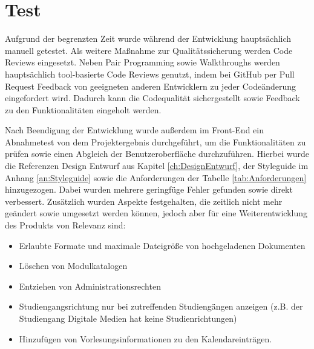 \section{Test}
Aufgrund der begrenzten Zeit wurde während der Entwicklung hauptsächlich manuell getestet. 
Als weitere Maßnahme zur Qualitätssicherung werden Code Reviews eingesetzt.
Neben Pair Programming sowie Walkthroughs werden hauptsächlich tool-basierte Code Reviews genutzt, indem bei GitHub per Pull Request Feedback von geeigneten anderen Entwicklern zu jeder Codeänderung eingefordert wird.
Dadurch kann die Codequalität sichergestellt sowie Feedback zu den Funktionalitäten eingeholt werden.

Nach Beendigung der Entwicklung wurde außerdem im Front-End ein Abnahmetest von dem Projektergebnis durchgeführt, um die Funktionalitäten zu prüfen sowie einen Abgleich der Benutzeroberfläche durchzuführen. 
Hierbei wurde die Referenzen Design Entwurf aus Kapitel \vref{ch:DesignEntwurf}, der Styleguide im Anhang \vref{an:Styleguide} sowie die Anforderungen der Tabelle \vref{tab:Anforderungen} hinzugezogen.
Dabei wurden mehrere geringfüge Fehler gefunden sowie direkt verbessert. 
Zusätzlich wurden Aspekte festgehalten, die zeitlich nicht mehr geändert sowie umgesetzt werden können, jedoch aber für eine Weiterentwicklung des Produkts von Relevanz sind: 

\begin{itemize}
    \item Erlaubte Formate und maximale Dateigröße von hochgeladenen Dokumenten
    \item Löschen von Modulkatalogen 
    \item Entziehen von Administrationsrechten
    \item Studiengangsrichtung nur bei zutreffenden Studiengängen anzeigen (z.B. der Studiengang Digitale Medien hat keine Studienrichtungen)
    \item Hinzufügen von Vorlesungsinformationen zu den Kalendareinträgen.
\end{itemize}